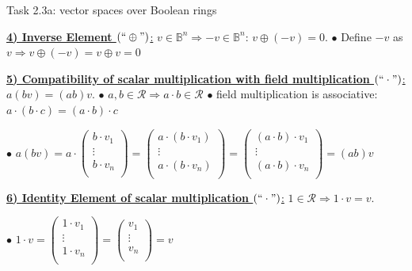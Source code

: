 \documentclass[aspectratio=169]{beamer}
\begin{document}
\begin{frame}{Task 2.3a: vector spaces over Boolean rings}

\underline{\textbf{4) Inverse Element $(``\oplus")$}:} $v \in \mathbb{B}^n \Rightarrow - v \in \mathbb{B}^n$: $v \oplus (- v) = 0$.\newline
$\bullet$ Define $- v$ as $v \Rightarrow v \oplus (- v) = v \oplus v = 0$\newline

\underline{\textbf{5) Compatibility of scalar multiplication with field multiplication $(``\cdot")$}:} $a(bv) = (ab)v$.\newline
$\bullet$ $a, b \in \mathcal{R} \Rightarrow a \cdot b \in \mathcal{R}$\newline
$\bullet$ field multiplication is associative: $a \cdot (b \cdot c) = (a \cdot b) \cdot c$\newline

$\bullet$ $a(bv) = a \cdot
\begin{pmatrix}
b \cdot v_1\\
\vdots\\
b \cdot v_n\\
\end{pmatrix} =
\begin{pmatrix}
a \cdot (b \cdot v_1)\\
\vdots\\
a \cdot (b \cdot v_n)\\
\end{pmatrix} =
\begin{pmatrix}
(a \cdot b) \cdot v_1\\
\vdots\\
(a \cdot b) \cdot v_n\\
\end{pmatrix} = (ab)v$\newline

\underline{\textbf{6) Identity Element of scalar multiplication $(``\cdot")$}:} $1 \in \mathcal{R} \Rightarrow 1 \cdot v = v$.\newline

$\bullet$ $1 \cdot v =
\begin{pmatrix}
1 \cdot v_1\\
\vdots\\
1 \cdot v_n\\
\end{pmatrix} =
\begin{pmatrix}
v_1\\
\vdots\\
v_n\\
\end{pmatrix} = v$

\end{frame}
\end{document}
